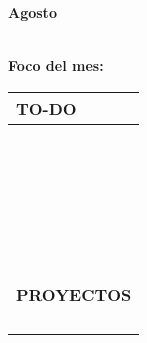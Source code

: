 {\raggedleft
	\fontsize{25}{50}\selectfont
	\textbf{Agosto}\\
}



	\textbf{\\Foco del mes:} \dotfill
	\renewcommand{\arraystretch}{1.5}\scriptsize
		\begin{longtabu} to \textwidth { X[l]}
		\centering \small{\textbf{TO-DO}} \\
		\toprule
		\makebox{$\square$} \dotfill\\
		\makebox{$\square$} \dotfill\\
		\makebox{$\square$} \dotfill\\
		\makebox{$\square$} \dotfill\\
		\makebox{$\square$} \dotfill\\
		\makebox{$\square$} \dotfill\\
		\makebox{$\square$} \dotfill\\
		\makebox{$\square$} \dotfill\\
		\makebox{$\square$} \dotfill\\
		\makebox{$\square$} \dotfill\\
		\makebox{$\square$} \dotfill\\
		\makebox{$\square$} \dotfill\\
		\makebox{$\square$} \dotfill\\
		\makebox{$\square$} \dotfill\\
		\makebox{$\square$} \dotfill\\
		\makebox{$\square$} \dotfill\\
		\makebox{$\square$} \dotfill\\
		\makebox{$\square$} \dotfill\\
		\makebox{$\square$} \dotfill\\
		\makebox{$\square$} \dotfill\\
		\makebox{$\square$} \dotfill\\
		\makebox{$\square$} \dotfill\\
		\makebox{$\square$} \dotfill\\
		\makebox{$\square$} \dotfill\\
		\makebox{$\square$} \dotfill\\

		\bottomrule

		\\
		\small{\textbf{PROYECTOS}} \\
		\makebox{$\square$} \dotfill\\
		\makebox{$\square$} \dotfill\\
		\makebox{$\square$} \dotfill\\
		\makebox{$\square$} \dotfill\\
	\end{longtabu}


